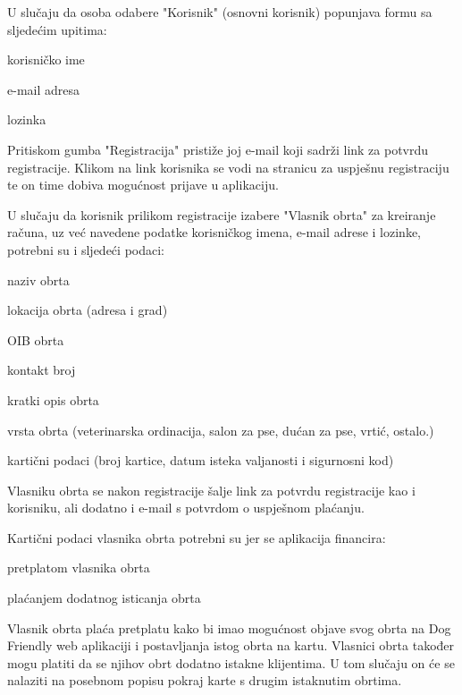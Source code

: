 		U slučaju da osoba odabere "Korisnik" (osnovni korisnik) popunjava formu sa sljedećim upitima:
		
		\begin{packed_item}
			\item {korisničko ime}
			\item {e-mail adresa}
			\item {lozinka}
		\end{packed_item}
  
        Pritiskom gumba "Registracija" pristiže joj e-mail koji sadrži link za potvrdu registracije. Klikom na link korisnika se vodi na stranicu za uspješnu registraciju te on time dobiva mogućnost prijave u aplikaciju.\newline 
        
		U slučaju da korisnik prilikom registracije izabere "Vlasnik obrta" za kreiranje računa, uz već navedene podatke korisničkog imena, e-mail adrese i lozinke, potrebni su i sljedeći podaci:
		
		\begin{packed_item}
			\item {naziv obrta}
			\item {lokacija obrta (adresa i grad)}
			\item {OIB obrta}
			\item {kontakt broj}
			\item {kratki opis obrta}
            \item {vrsta obrta (veterinarska ordinacija, salon za pse, dućan za pse, vrtić, ostalo.)}
			\item {kartični podaci (broj kartice, datum isteka valjanosti i sigurnosni kod)}
		\end{packed_item}
  
		Vlasniku obrta se nakon registracije šalje link za potvrdu registracije kao i korisniku, ali dodatno i e-mail s potvrdom o uspješnom plaćanju.
  
		Kartični podaci vlasnika obrta potrebni su jer se aplikacija financira:
			\begin{packed_item}
			\item {pretplatom vlasnika obrta}
			\item {plaćanjem dodatnog isticanja obrta}
		\end{packed_item}
  
		Vlasnik obrta plaća pretplatu kako bi imao mogućnost objave svog obrta na Dog Friendly web aplikaciji i postavljanja istog obrta na kartu. Vlasnici obrta također mogu platiti da se njihov obrt dodatno istakne klijentima. U tom slučaju on će se nalaziti na posebnom popisu pokraj karte s drugim istaknutim obrtima.\newline
  
